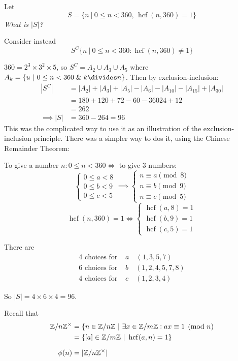 \documentclass[10pt]{scrartcl}
\DeclareMathOperator{\hcf}{hcf}
\begin{document}
\begin{example}
Let 
\[S =\{n ~|~ 0 \leq n < 360,\,\hcf(n,360)=1\}\]
\emph{What is $|S|$?}

Consider instead
\[S^C\{n ~|~ 0 \leq n < 360: \hcf(n,360) \neq 1\}\]

$360 = 2^3 \times 3^2 \times 5$, so $S^C = A_2\cup A_3 \cup A_5$ where $A_k = \{u ~|~ 0 \leq n < 360 \;\&\; k \divides n\}$. Then by exclusion-inclusion:
\[
\begin{aligned}
  |S^C| &= |A_2| + |A_3| + |A_5| - |A_6| - |A_{10}| - |A_{15}|+ |A_{30}|\\
  &= 180 + 120 + 72 - 60 - 36 0 24 + 12\\
  &= 262\\
  \implies |S| &= 360 - 264 = 96
\end{aligned}
\]
This was the complicated way to use it as an illustration of the exclusion-inclusion principle. There was a simpler way to dos it, using the Chinese Remainder Theorem: 

 To give a number $n:  0 \leq n < 360 
\iff$ to give 3 numbers:
\[
\begin{cases}
 0 \leq a < 8\\
 0 \leq b < 9\\
 0 \leq c < 5  
\end{cases} \implies 
\begin{cases}
n \equiv a \pmod{8}\\
n \equiv b \pmod{9}\\
n \equiv c \pmod{5}	
\end{cases}
\]
\[\hcf(n,360) = 1 \iff \begin{cases}
 \hcf(a,8) = 1\\
 \hcf(b,9) = 1\\
 \hcf(c,5) = 1	
 \end{cases}
 \]
 
There are
\[
\begin{aligned}
  4 \text{ choices for } &a \quad (1,3,5,7)\\
  6 \text{ choices for } &b \quad (1,2,4,5,7,8)\\
  4 \text{ choices for } &c \quad (1,2,3,4)
\end{aligned}
\]

So $|S| =  4 \times 6 \times 4= 96$. 
\end{example}\vspace*{5pt}


Recall that 
\[
\begin{aligned}
   \Z / n \Z^\times &= \{n \in \Z / n \Z ~|~ \exists x \in \Z / m\Z: ax \equiv 1 \pmod{n}\\
   &= \{[a] \in \Z/m\Z ~|~ \hcf(a,n) = 1\}\\[0.2cm]
   \phi(n) &= |\Z /n \Z^\times|
\end{aligned}
\]\vsp
\end{document}
